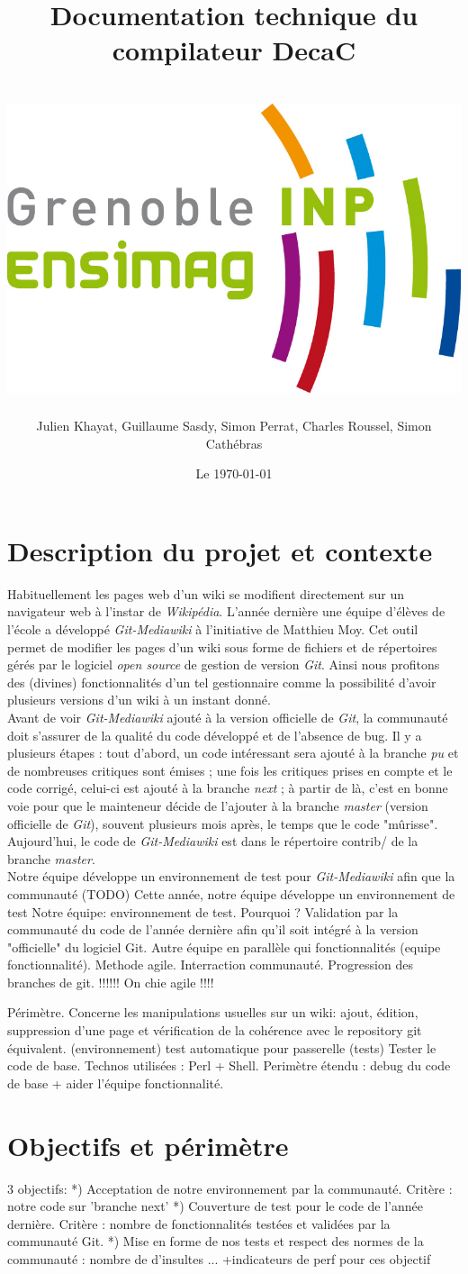\documentclass[11pt]{article}
\title{Documentation technique du compilateur DecaC\\
~\\
\includegraphics[scale=0.75]{logo_ensimag.jpg} 
}
\author{Julien Khayat, Guillaume Sasdy, Simon Perrat, Charles Roussel, Simon Cathébras}
\date{Le \today}
\begin{document}
\section*{Description du projet et contexte}
Habituellement les pages web d'un wiki se modifient directement sur un navigateur web à l'instar de \textit{Wikipédia}. L'année dernière une équipe d'élèves de l'école a développé \textit{Git-Mediawiki} à l'initiative de Matthieu Moy. Cet outil permet de modifier les pages d'un wiki sous forme de fichiers et de répertoires gérés par le logiciel \textit{open source} de gestion de version \textit{Git}. Ainsi nous profitons des (divines) fonctionnalités d'un tel gestionnaire comme la possibilité d'avoir plusieurs versions d'un wiki à un instant donné.\\
Avant de voir \textit{Git-Mediawiki} ajouté à la version officielle de \textit{Git}, la communauté doit s'assurer de la qualité du code développé et de l'absence de bug. Il y a plusieurs étapes : tout d'abord, un code intéressant sera ajouté à la branche \textit{pu} et de nombreuses critiques sont émises ; une fois les critiques prises en compte et le code corrigé, celui-ci est ajouté à la branche \textit{next} ; à partir de là, c'est en bonne voie pour que le mainteneur décide de l'ajouter à la branche \textit{master} (version officielle de \textit{Git}), souvent plusieurs mois après, le temps que le code "mûrisse". Aujourd'hui, le code de \textit{Git-Mediawiki} est dans le répertoire contrib/ de la branche \textit{master}. \\
Notre équipe développe un environnement de test pour \textit{Git-Mediawiki} afin que la communauté 
(TODO)
Cette année, notre équipe développe un environnement de test 
Notre équipe: environnement de test. Pourquoi ? Validation par la communauté du code de l'année dernière afin qu'il soit     intégré à la version "officielle" du logiciel Git.
Autre équipe en parallèle qui fonctionnalités (equipe fonctionnalité).
Methode agile. Interraction communauté. Progression des branches de git.
!!!!!! On chie agile !!!!


Périmètre. Concerne les manipulations usuelles sur un wiki: ajout, édition, suppression d'une page et vérification de la     cohérence avec le repository git équivalent. (environnement)
test automatique pour passerelle (tests)
Tester le code de base. Technos utilisées : Perl + Shell.
Perimètre étendu : debug du code de base + aider l'équipe fonctionnalité.
		
\section*{Objectifs et périmètre}
3 objectifs:
*) Acceptation de notre environnement par la communauté. Critère : notre code sur 'branche next'
*) Couverture de test pour le code de l'année dernière. Critère : nombre de fonctionnalités testées et validées par la       communauté Git.
*) Mise en forme de nos tests et respect des normes de la communauté : nombre de d'insultes ...
+indicateurs de perf pour ces objectif
\end{document}
